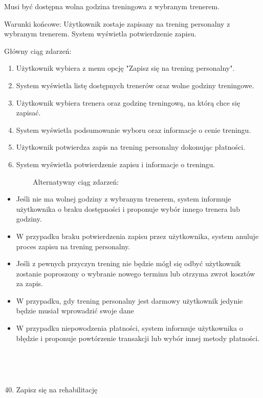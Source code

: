 {Musi być dostępna wolna godzina treningowa z wybranym trenerem.}

{Warunki końcowe: Użytkownik zostaje zapisany na trening personalny z
wybranym trenerem. System wyświetla potwierdzenie zapisu.}

{Główny ciąg zdarzeń:}

\begin{enumerate}
\tightlist
\item
  {Użytkownik wybiera z menu opcję "Zapisz się na trening personalny".}
\item
  {System wyświetla listę dostępnych trenerów oraz wolne godziny
  treningowe.}
\item
  {Użytkownik wybiera trenera oraz godzinę treningową, na którą chce się
  zapisać.}
\item
  {System wyświetla podsumowanie wyboru oraz informacje o cenie
  treningu.}
\item
  {Użytkownik potwierdza zapis na trening personalny dokonując
  płatności.}
\item
  {System wyświetla potwierdzenie zapisu i informacje o treningu.}
\end{enumerate}

{~~~~~~~~Alternatywny ciąg zdarzeń:}

\begin{itemize}
\tightlist
\item
  {Jeśli nie ma wolnej godziny z wybranym trenerem, system informuje
  użytkownika o braku dostępności i proponuje wybór innego trenera lub
  godziny.}
\item
  {W przypadku braku potwierdzenia zapisu przez użytkownika, system
  anuluje proces zapisu na trening personalny.}
\item
  {Jeśli z pewnych przyczyn trening nie będzie mógł się odbyć użytkownik
  zostanie poproszony o wybranie nowego terminu lub otrzyma zwrot
  kosztów za zapis.}
\item
  {W przypadku, gdy trening personalny jest darmowy użytkownik jedynie
  będzie musiał wprowadzić swoje dane}
\item
  {W przypadku niepowodzenia płatności, system informuje użytkownika o
  błędzie i proponuje powtórzenie transakcji lub wybór innej metody
  płatności.\\
  \strut \\
  \strut \\
  }
\end{itemize}

\begin{enumerate}
\setcounter{enumi}{39}
\tightlist
\item
  {Zapisz się na rehabilitację}
\end{enumerate}


